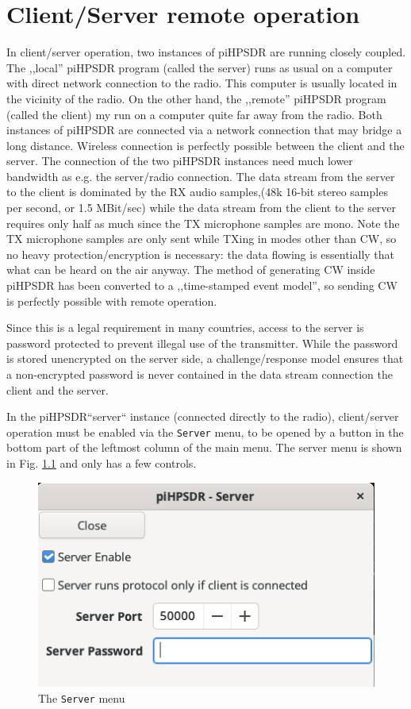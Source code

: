 \documentclass[12pt]{book}
\def\bltt#1{\texttt{\color{blue}#1}}
\def\pH{pi\-HPSDR\xspace}
\begin{document}
\chapter{Client/Server remote operation}
\label{sec:clientserver}

In client/server operation, two instances of \pH are running closely coupled. The ,,local'' \pH program
(called the server) runs as usual on a computer with direct network connection to the radio. This computer is usually located
in the vicinity of the radio. On the other hand, the ,,remote'' \pH program (called the client) my run
on a computer quite far away from the radio. Both instances of \pH are connected via a network connection
that may bridge a long distance. Wireless connection is perfectly possible between the client and the server.
The connection of the two \pH instances need much lower bandwidth as e.g. the server/radio connection.
The data stream from the server to the client is dominated by the RX audio samples,(48k 16-bit
stereo samples per second, or  1.5 MBit/sec) while the data stream from the client to the server requires
only half as much since the TX microphone samples are mono. Note the TX microphone samples are only sent
while TXing in modes other than CW, so no heavy protection/encryption is necessary: the data flowing is
essentially that what can be heard on the air anyway. The method of generating CW inside \pH has been
converted to a ,,time-stamped event model'', so sending CW is perfectly possible with remote operation.

Since this is a legal requirement in many countries, access to the server is password protected to prevent
illegal use of the transmitter. While the password is stored unencrypted on the server side, a challenge/response
model ensures that a non-encrypted password is never contained in the data stream connection the client and
the server.

In the \pH ``server`` instance (connected directly to the radio), client/server operation must be enabled
via the \bltt{Server} menu, to be opened by a button in the bottom  part of the leftmost  column of the  main menu.
The server menu is shown in Fig. \ref{fig:servermenu} and only has a few controls.

\begin{figure}[ht]
\center
\includegraphics[scale=0.45]{ServerMenu.png}
\caption{The \bltt{Server} menu}
\label{fig:servermenu}
\end{figure}
\end{document}

